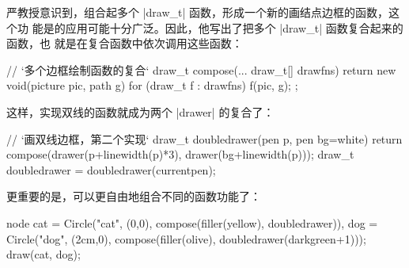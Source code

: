 严教授意识到，组合起多个 |draw_t| 函数，形成一个新的画结点边框的函数，这个功
能是的应用可能十分广泛。因此，他写出了把多个 |draw_t| 函数复合起来的函数，也
就是在复合函数中依次调用这些函数：
\begin{asycode}
// `\color{comment}多个边框绘制函数的复合`
draw_t compose(... draw_t[] drawfns)
{
    return new void(picture pic, path g) {
        for (draw_t f : drawfns)
            f(pic, g);
    };
}
\end{asycode}
这样，实现双线的函数就成为两个 |drawer| 的复合了：
\begin{asycode}
// `\color{comment}画双线边框，第二个实现`
draw_t doubledrawer(pen p, pen bg=white)
{
    return compose(drawer(p+linewidth(p)*3), drawer(bg+linewidth(p)));
}
draw_t doubledrawer = doubledrawer(currentpen);
\end{asycode}
更重要的是，可以更自由地组合不同的函数功能了：
\begin{asycode}
node cat = Circle("cat", (0,0), compose(filler(yellow), doubledrawer)),
     dog = Circle("dog", (2cm,0), compose(filler(olive), doubledrawer(darkgreen+1)));
draw(cat, dog);
\end{asycode}
